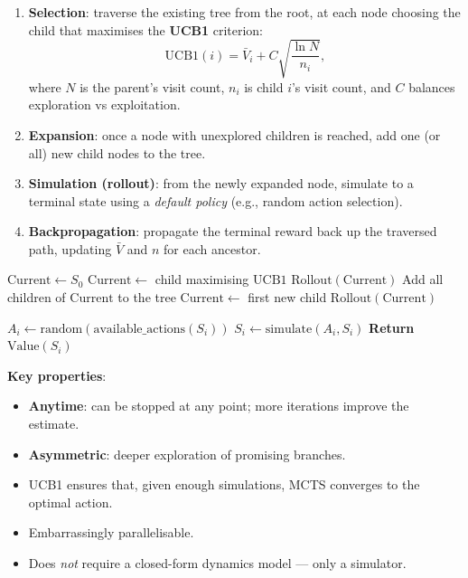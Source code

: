 \documentclass[11pt,a4paper]{article}
\theoremstyle{definition}
\theoremstyle{plain}
\theoremstyle{remark}
\begin{document}
\begin{enumerate}
    \item \textbf{Selection}: traverse the existing tree from the root, at each node choosing the child that maximises the \textbf{UCB1} criterion:
    \[
        \mathrm{UCB1}(i) = \bar{V}_i + C\sqrt{\frac{\ln N}{n_i}},
    \]
    where $N$ is the parent's visit count, $n_i$ is child $i$'s visit count, and $C$ balances exploration vs exploitation.
    \item \textbf{Expansion}: once a node with unexplored children is reached, add one (or all) new child nodes to the tree.
    \item \textbf{Simulation (rollout)}: from the newly expanded node, simulate to a terminal state using a \emph{default policy} (e.g., random action selection).
    \item \textbf{Backpropagation}: propagate the terminal reward back up the traversed path, updating $\bar{V}$ and $n$ for each ancestor.
\end{enumerate}

\begin{algorithm}
\caption{MCTS: Selection and Expansion}
\begin{algorithmic}
\STATE $\mathrm{Current} \leftarrow S_0$
    \STATE $\mathrm{Current} \leftarrow$ child maximising $\mathrm{UCB1}$
\ENDWHILE
{}
    \STATE $\mathrm{Rollout}(\mathrm{Current})$
\ELSE
    \STATE Add all children of $\mathrm{Current}$ to the tree
    \STATE $\mathrm{Current} \leftarrow$ first new child
    \STATE $\mathrm{Rollout}(\mathrm{Current})$
\ENDIF
\end{algorithmic}
\end{algorithm}

\begin{algorithm}
\caption{MCTS: Rollout}
\begin{algorithmic}
    \STATE $A_i \leftarrow \mathrm{random}(\mathrm{available\_actions}(S_i))$
    \STATE $S_i \leftarrow \mathrm{simulate}(A_i, S_i)$
\ENDWHILE
\STATE \textbf{Return} $\mathrm{Value}(S_i)$
\end{algorithmic}
\end{algorithm}

\textbf{Key properties}:
\begin{itemize}
    \item \textbf{Anytime}: can be stopped at any point; more iterations improve the estimate.
    \item \textbf{Asymmetric}: deeper exploration of promising branches.
    \item UCB1 ensures that, given enough simulations, MCTS converges to the optimal action.
    \item Embarrassingly parallelisable.
    \item Does \emph{not} require a closed-form dynamics model — only a simulator.
\end{itemize}
\end{document}
